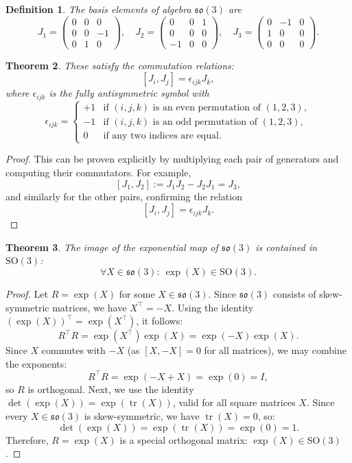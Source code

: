 \documentclass{amsart}
\newtheorem{theorem}{Theorem}[section]
\newtheorem{definition}[theorem]{Definition}
\theoremstyle{remark}
\DeclareMathOperator{\tr}{tr}
\begin{document}
\begin{definition}
  The basis elements of algebra $\mathfrak{so}(3)$ are
  \[
  J_1 = \begin{pmatrix} 0 & 0 & 0 \\ 0 & 0 & -1 \\ 0 & 1 & 0 \end{pmatrix}, \quad
  J_2 = \begin{pmatrix} 0 & 0 & 1 \\ 0 & 0 & 0 \\ -1 & 0 & 0 \end{pmatrix}, \quad
  J_3 = \begin{pmatrix} 0 & -1 & 0 \\ 1 & 0 & 0 \\ 0 & 0 & 0 \end{pmatrix}.
  \]
\end{definition}

\begin{theorem}
  These satisfy the commutation relations:
  \[
  [J_i, J_j] = \epsilon_{ijk} J_k,
  \]
  where $\epsilon_{ijk}$ is the fully antisymmetric symbol with
  \[
  \epsilon_{ijk} =
  \begin{cases}
    +1 & \text{if } (i,j,k) \text{ is an even permutation of } (1,2,3), \\
    -1 & \text{if } (i,j,k) \text{ is an odd permutation of } (1,2,3), \\
    0 & \text{if any two indices are equal}.
  \end{cases}
  \]
\end{theorem}
\begin{proof}
  This can be proven explicitly by multiplying each pair of generators and computing their commutators. For example,
  \[
  [J_1, J_2] := J_1 J_2 - J_2 J_1 = J_3,
  \]
  and similarly for the other pairs, confirming the relation
  \[
  [J_i, J_j] = \epsilon_{ijk} J_k.
  \]
\end{proof}

\begin{theorem}
  The image of the exponential map of $\mathfrak{so}(3)$ is contained in $\mathrm{SO}(3)$:
  \[
  \forall X \in \mathfrak{so}(3):\ \exp(X) \in \mathrm{SO}(3).
  \]
\end{theorem}
\begin{proof}
  Let $R = \exp(X)$ for some $X \in \mathfrak{so}(3)$. Since $\mathfrak{so}(3)$ consists of skew-symmetric matrices, we have $X^\top = -X$. Using the identity $\left(\exp(X)\right)^\top = \exp(X^\top)$, it follows:
  \[
  R^\top R = \exp(X^\top)\exp(X) = \exp(-X)\exp(X).
  \]
  Since $X$ commutes with $-X$ (as $[X, -X] = 0$ for all matrices), we may combine the exponents:
  \[
  R^\top R = \exp(-X + X) = \exp(0) = I,
  \]
  so $R$ is orthogonal. Next, we use the identity $\det(\exp(X)) = \exp(\tr(X))$, valid for all square matrices $X$. Since every $X \in \mathfrak{so}(3)$ is skew-symmetric, we have $\tr(X) = 0$, so:
  \[
  \det(\exp(X)) = \exp(\tr(X)) = \exp(0) = 1.
  \]
  Therefore, $R = \exp(X)$ is a special orthogonal matrix: $\exp(X) \in \mathrm{SO}(3)$.
\end{proof}
\end{document}
